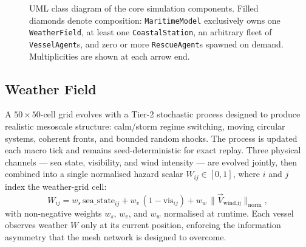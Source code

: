 \documentclass[cameraready]{Interspeech}
\begin{document}
\begin{figure}[t]
\caption{UML class diagram of the core simulation components. Filled diamonds denote composition: \texttt{MaritimeModel} exclusively owns one \texttt{WeatherField}, at least one \texttt{CoastalStation}, an arbitrary fleet of \texttt{VesselAgent}s, and zero or more \texttt{RescueAgent}s spawned on demand. Multiplicities are shown at each arrow end.}
\label{fig:classes}
\end{figure}

\subsection{Weather Field}

A $50 \times 50$-cell grid evolves with a Tier-2 stochastic process designed to produce realistic mesoscale structure: calm/storm regime switching, moving circular systems, coherent fronts, and bounded random shocks. The process is updated each macro tick and remains seed-deterministic for exact replay. Three physical channels --- sea state, visibility, and wind intensity --- are evolved jointly, then combined into a single normalised hazard scalar $W_{ij} \in [0,1]$, where $i$ and $j$ index the weather-grid cell:
%
\begin{equation}
  W_{ij} = w_s\,\text{sea\_state}_{ij}
          + w_v\,(1 - \text{vis}_{ij})
          + w_w\,\lVert\vec{V}_\text{wind,ij}\rVert_\text{norm},
  \label{eq:W}
\end{equation}
%
with non-negative weights $w_s$, $w_v$, and $w_w$ normalised at runtime. Each vessel observes weather $W$ only at its current position, enforcing the information asymmetry that the mesh network is designed to overcome.
\end{document}
